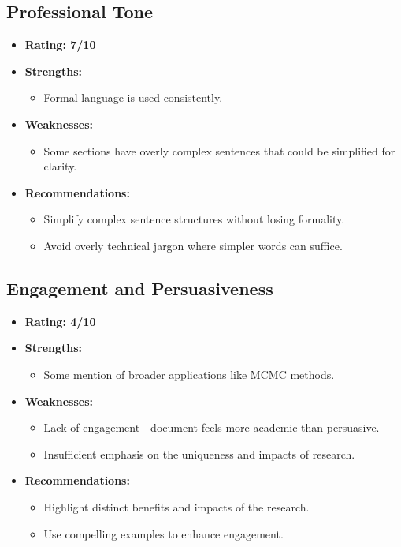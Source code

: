 \documentclass{article}
\begin{document}
\subsection{Professional Tone}
\begin{itemize}
    \item \textbf{Rating: 7/10}
    \item \textbf{Strengths:}
    \begin{itemize}
        \item Formal language is used consistently.
    \end{itemize}
    \item \textbf{Weaknesses:}
    \begin{itemize}
        \item Some sections have overly complex sentences that could be simplified for clarity.
    \end{itemize}
    \item \textbf{Recommendations:}
    \begin{itemize}
        \item Simplify complex sentence structures without losing formality.
        \item Avoid overly technical jargon where simpler words can suffice.
    \end{itemize}
\end{itemize}

\subsection{Engagement and Persuasiveness}
\begin{itemize}
    \item \textbf{Rating: 4/10}
    \item \textbf{Strengths:}
    \begin{itemize}
        \item Some mention of broader applications like MCMC methods.
    \end{itemize}
    \item \textbf{Weaknesses:}
    \begin{itemize}
        \item Lack of engagement—document feels more academic than persuasive.
        \item Insufficient emphasis on the uniqueness and impacts of research.
    \end{itemize}
    \item \textbf{Recommendations:}
    \begin{itemize}
        \item Highlight distinct benefits and impacts of the research.
        \item Use compelling examples to enhance engagement.
    \end{itemize}
\end{itemize}
\end{document}
